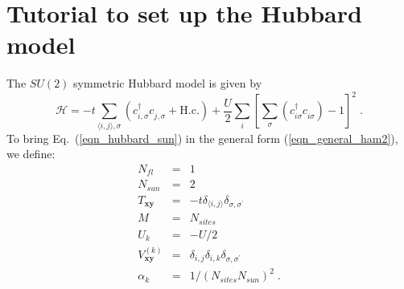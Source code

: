 \section{Tutorial to set up the Hubbard model}
The $SU(2)$ symmetric Hubbard model is given by
\begin{equation}
\label{eqn_hubbard_sun}
\mathcal{H}=
-t\sum\limits_{\langle i,j\rangle,\sigma} 
\left(c^{\dagger}_{i,\sigma} c^{\phantom\dagger}_{j,\sigma} + \text{H.c.}
\right)
+ \frac{U}{2}\sum\limits_{i}\left[
\sum\limits_{\sigma}
( c^{\dagger}_{i\sigma} c^{\phantom\dagger}_{i\sigma}) -1 \right]^{2}\;.
\end{equation}
To bring Eq.~(\ref{eqn_hubbard_sun}) in the general form (\ref{eqn_general_ham2}), we define:
\begin{eqnarray}
N_{fl}&=&1\nonumber\\
N_{sun}&=&2\nonumber\\
T_{\bm{x}\bm{y}}&=&-t\delta_{\langle i,j\rangle}\delta_{\sigma,\sigma^{\prime}}\nonumber\\
M&=&N_{sites}\nonumber\\
U_{k}&=&-U/2\nonumber\\
V_{\bm{x}\bm{y}}^{(k)}&=&\delta_{i,j}\delta_{i,k}\delta_{\sigma,\sigma^{\prime}}\nonumber\\
\alpha_{k}&=&1/(N_{sites}N_{sun})^{2}\;.
\end{eqnarray}